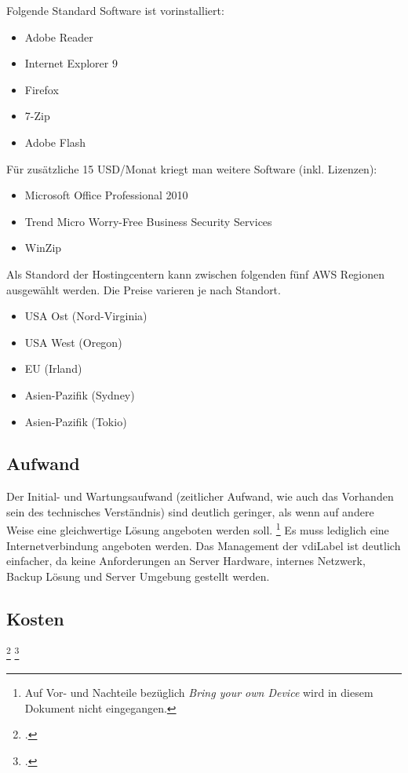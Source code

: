 Folgende Standard Software ist vorinstalliert:
\begin{itemize}
	\item Adobe Reader
	\item Internet Explorer 9
	\item Firefox
	\item 7-Zip
	\item Adobe Flash
\end{itemize}

Für zusätzliche 15 USD/Monat kriegt man weitere Software (inkl. Lizenzen):
\begin{itemize}
	\item Microsoft Office Professional 2010
	\item Trend Micro Worry-Free Business Security Services
	\item WinZip
\end{itemize}

Als Standord der Hostingcentern kann zwischen folgenden fünf AWS Regionen ausgewählt werden. Die Preise varieren je nach Standort.
\begin{itemize}
	\item USA Ost (Nord-Virginia)
	\item USA West (Oregon)
	\item EU (Irland)
	\item Asien-Pazifik (Sydney)
	\item Asien-Pazifik (Tokio)
\end{itemize}


\subsection{Aufwand}
Der Initial- und Wartungsaufwand (zeitlicher Aufwand, wie auch das Vorhanden sein des technisches Verständnis) sind deutlich geringer, als wenn auf andere Weise eine gleichwertige Lösung angeboten werden soll. \footnote{Auf Vor- und Nachteile bezüglich \textit{Bring your own Device} wird in diesem Dokument nicht eingegangen.}
Es muss lediglich eine Internetverbindung angeboten werden.
Das Management der \Gls{vdiLabel} ist deutlich einfacher, da keine Anforderungen an Server Hardware, internes Netzwerk, Backup Lösung und Server Umgebung gestellt werden.


\subsection{Kosten}


\footcite{AWS_Amazon_WorkSpaces_Preise_2014-11-15}
\footcite{TCO_Comparison_Amazon_WorkSpaces_and_Traditional_Virtual_Desktop_Infrastructure_VDI_2014-11-15}


